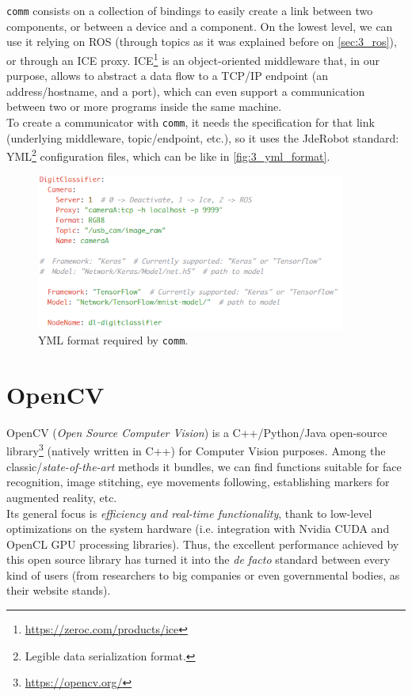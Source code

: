 		\texttt{comm} consists on a collection of bindings to easily create a link between two components, or between a device and a component. On the lowest level, we can use it relying on ROS (through topics as it was explained before on \autoref{sec:3_ros}), or through an ICE proxy. ICE\footnote{\url{https://zeroc.com/products/ice}} is an object-oriented middleware that, in our purpose, allows to abstract a data flow to a TCP/IP endpoint (an address/hostname, and a port), which can even support a communication between two or more programs inside the same machine.\\
		
		To create a communicator with \texttt{comm}, it needs the specification for that link (underlying middleware, topic/endpoint, etc.), so it uses the JdeRobot standard: YML\footnote{Legible data serialization format.} configuration files, which can be like in \autoref{fig:3_yml_format}.
		\begin{figure}[h]
			\centering
			\includegraphics[width=4in]{images/yml_format}
			\caption{YML format required by \texttt{comm}.}
			\label{fig:3_yml_format}
		\end{figure}
		
\section{OpenCV}
	OpenCV (\emph{Open Source Computer Vision}) is a C++/Python/Java open-source library\footnote{\url{https://opencv.org/}} (natively written in C++) for Computer Vision purposes. Among the classic/\emph{state-of-the-art} methods it bundles, we can find functions suitable for face recognition, image stitching, eye movements following, establishing markers for augmented reality, etc.\\
	
	Its general focus is \emph{efficiency and real-time functionality}, thank to low-level optimizations on the system hardware (i.e. integration with Nvidia CUDA and OpenCL GPU processing libraries). Thus, the excellent performance achieved by this open source library has turned it into the \emph{de facto} standard between every kind of users (from researchers to big companies or even governmental bodies, as their website stands).\\
	
